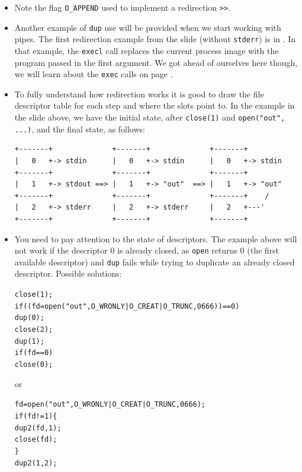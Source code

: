 \begin{itemize}
\item Note the flag \texttt{O\_APPEND} used to implement a redirection
\texttt{>>}.
\item {} Another example of \texttt{dup} use will be provided when
we start working with pipes.  The first redirection example from the slide
(without \texttt{stderr}) is in .  In that example, the
\texttt{execl} call replaces the current process image with the
program passed in the first argument.  We got ahead of ourselves here though, we
will learn about the \texttt{exec} calls on page \pageref{EXEC}.
\item To fully understand how redirection works it is good to draw the file
descriptor table for each step and where the slots point to.  In 
the  example in the slide above, we have the initial state, after
\texttt{close(1)} and \texttt{open("out", ...)}, and the final state, as
follows:

\begin{verbatim}
+-------+              +-------+              +-------+
|   0   +-> stdin      |   0   +-> stdin      |   0   +-> stdin
+-------+              +-------+              +-------+
|   1   +-> stdout ==> |   1   +-> "out"  ==> |   1   +-> "out"
+-------+              +-------+              +-------+    /
|   2   +-> stderr     |   2   +-> stderr     |   2   +---' 
+-------+              +-------+              +-------+
\end{verbatim}

\item You need to pay attention to the state of descriptors. The  example
above will not work if the descriptor 0 is already closed, as 
\texttt{open} returns 0 (the first available descriptor) and \texttt{dup} fails
while trying to duplicate an already closed descriptor.  Possible
solutions:

\begin{alltt}
close(1);
if ((fd = open("out", O\_WRONLY | O\_CREAT | O\_TRUNC, 0666)) == 0)
        dup(0);
close(2);
dup(1);
if (fd == 0)
        close(0);
\end{alltt}

or

\begin{alltt}
fd = open("out", O\_WRONLY | O\_CREAT | O\_TRUNC, 0666);
if (fd != 1) \{
        dup2(fd, 1);
        close(fd);
\}
dup2(1, 2);
\end{alltt}
\end{itemize}


